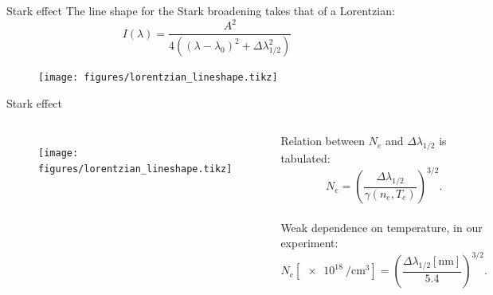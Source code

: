 \documentclass[]{beamer}
\begin{document}
  \begin{frame}{Stark effect}
    The line shape for the Stark broadening takes that of a Lorentzian:
    \begin{equation*}
      I\left( \lambda \right)=\frac{A^2}{4\left( \left(\lambda-\lambda_0\right)^2+\Delta \lambda_{1/2}^2\right)}
    \end{equation*}
    \begin{figure}
\texttt{[image: figures/lorentzian\_lineshape.tikz]}
    \end{figure}
\end{frame}
\begin{frame}{Stark effect}
  \begin{columns}
    \begin{figure}
      \texttt{[image: figures/lorentzian\_lineshape.tikz]}
    \end{figure}
    Relation between $N_e$ and $\Delta \lambda_{1/2}$ is tabulated: $$N_e=\left( \frac{\Delta\lambda_{1/2}}{\gamma\left(n_e,T_e\right)}\right)^{3/2}.$$
    \\
    Weak dependence on temperature, in our experiment: $$N_e\left[\SI{e18}{\per\cubic\cm}\right]=\left( \frac{\Delta\lambda_{1/2}\left[\si{\nm}\right]}{5.4}\right)^{3/2}.$$
  \end{columns}
  \end{frame}
\end{document}

